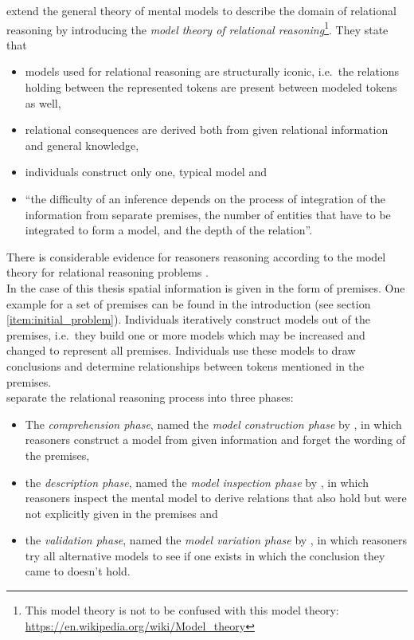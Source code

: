 \documentclass[hidelinks]{scrartcl}
\begin{document}
\cite{Goodwin.2005} extend the general theory of mental models to describe the domain of relational reasoning by introducing the \textit{model theory of relational reasoning}\footnote{This model theory is not to be confused with this model theory: \url{https://en.wikipedia.org/wiki/Model_theory}}. They state that
\begin{itemize}
\item models used for relational reasoning are structurally iconic, i.e.\ the relations holding between the represented tokens are present between modeled tokens as well,
\item relational consequences are derived both from given relational information and general knowledge,
\item individuals construct only one, typical model and
\item ``the difficulty of an inference depends on the process of integration of the information from separate premises, the number of entities that have to be integrated to form a model, and the depth of the relation''.
\end{itemize}

There is considerable evidence for reasoners reasoning according to the model theory for relational reasoning problems \citep{Schaeken.2007}. \\


In the case of this thesis spatial information is given in the form of premises. One example for a set of premises can be found in the introduction (see section \ref{item:initial_problem}). Individuals iteratively construct models out of the premises, i.e.\ they build one or more models which may be increased and changed to represent all premises. Individuals use these models to draw conclusions and determine relationships between tokens mentioned in the premises. \\

\citet{Johnson-Laird.1991} separate the relational reasoning process into three phases:
\begin{itemize}
\item The \textit{comprehension phase}, named the \textit{model construction phase} by \cite{Ragni.2013}, in which reasoners construct a model from given information and forget the wording of the premises,
\item the \textit{description phase}, named the \textit{model inspection phase} by \cite{Ragni.2013}, in which reasoners inspect the mental model to derive relations that also hold but were not explicitly given in the premises and
\item the \textit{validation phase}, named the \textit{model variation phase} by \cite{Ragni.2013}, in which reasoners try all alternative models to see if one exists in which the conclusion they came to doesn't hold.
\end{itemize}
\end{document}
